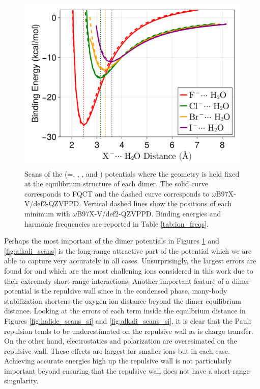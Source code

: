 \documentclass[journal=jacsat,manuscript=article]{achemso}
\begin{document}
\begin{figure}[h]
  \includegraphics*[width=\textwidth]{figures/anion_dimer_scans.png}
  \caption{Scans of the  (=, , , and )
  potentials where the geometry is held fixed at the equilibrium structure of each dimer.
  The solid curve corresponds to FQCT and the dashed curve corresponds to $\omega$B97X-V/def2-QZVPPD.
  Vertical dashed lines show the positions of each minimum with $\omega$B97X-V/def2-QZVPPD.
  Binding energies and harmonic frequencies are reported in Table \ref{tab:ion_freqs}.
  }\label{fig:halide_scans}
\end{figure}

Perhaps the most important of the dimer potentials in Figures \ref{fig:halide_scans} and \ref{fig:alkali_scans} is the long-range attractive part of the potential which we are able to capture very accurately in all cases. Unsurprisingly, the largest errors are found for  and  which are the most challening ions considered in this work due to their extremely short-range interactions. Another important feature of a dimer potential is the repulsive wall since in the condensed phase, many-body stabilization shortens the oxygen-ion distance beyond the dimer equilibrium distance. Looking at the errors of each term inside the equilbrium distance in Figures \ref{fig:halide_scans_si} and \ref{fig:alkali_scans_si}, it is clear that the Pauli repulsion tends to be underestimated on the repulsive wall as is charge transfer. On the other hand, electrostatics and polarization are overesimated on the repulsive wall. These effects are largest for smaller ions but in each case. Achieving accurate energies high up the repulsive wall is not particularly important beyond ensuring that the repulsive wall does not have a short-range singularity.
\end{document}
